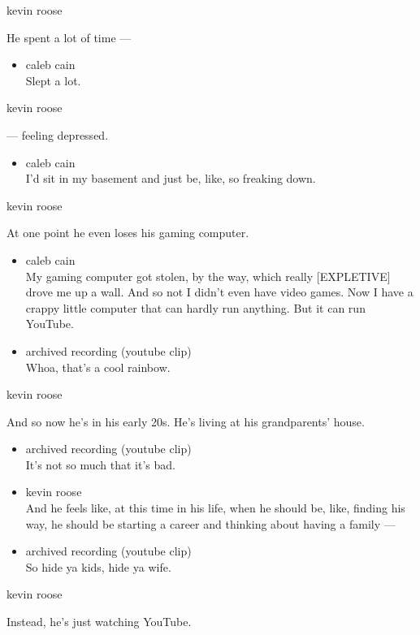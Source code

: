 kevin roose

He spent a lot of time ---

\begin{itemize}
\tightlist
\item
  caleb cain\\
  Slept a lot.
\end{itemize}

kevin roose

--- feeling depressed.

\begin{itemize}
\tightlist
\item
  caleb cain\\
  I'd sit in my basement and just be, like, so freaking down.
\end{itemize}

kevin roose

At one point he even loses his gaming computer.

\begin{itemize}
\item
  caleb cain\\
  My gaming computer got stolen, by the way, which really
  {[}EXPLETIVE{]} drove me up a wall. And so not I didn't even have
  video games. Now I have a crappy little computer that can hardly run
  anything. But it can run YouTube.
\item
  archived recording (youtube clip)\\
  Whoa, that's a cool rainbow.
\end{itemize}

kevin roose

And so now he's in his early 20s. He's living at his grandparents'
house.

\begin{itemize}
\item
  archived recording (youtube clip)\\
  It's not so much that it's bad.
\item
  kevin roose\\
  And he feels like, at this time in his life, when he should be, like,
  finding his way, he should be starting a career and thinking about
  having a family ---
\item
  archived recording (youtube clip)\\
  So hide ya kids, hide ya wife.
\end{itemize}

kevin roose

Instead, he's just watching YouTube.

